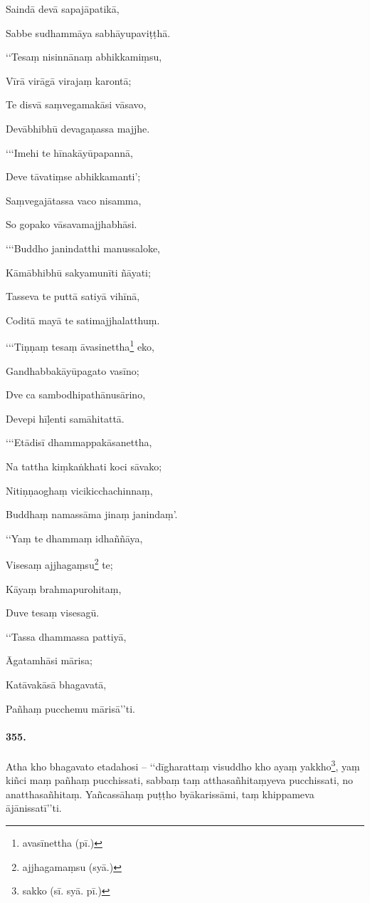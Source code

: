 Saindā devā sapajāpatikā,

Sabbe sudhammāya sabhāyupaviṭṭhā.

‘‘Tesaṃ nisinnānaṃ abhikkamiṃsu,

Vīrā virāgā virajaṃ karontā;

Te disvā saṃvegamakāsi vāsavo,

Devābhibhū devagaṇassa majjhe.

‘‘‘Imehi te hīnakāyūpapannā,

Deve tāvatiṃse abhikkamanti’;

Saṃvegajātassa vaco nisamma,

So gopako vāsavamajjhabhāsi.

‘‘‘Buddho janindatthi manussaloke,

Kāmābhibhū sakyamunīti ñāyati;

Tasseva te puttā satiyā vihīnā,

Coditā mayā te satimajjhalatthuṃ.

‘‘‘Tiṇṇaṃ tesaṃ āvasinettha\footnote{avasīnettha (pī.)} eko,

Gandhabbakāyūpagato vasīno;

Dve ca sambodhipathānusārino,

Devepi hīḷenti samāhitattā.

‘‘‘Etādisī dhammappakāsanettha,

Na tattha kiṃkaṅkhati koci sāvako;

Nitiṇṇaoghaṃ vicikicchachinnaṃ,

Buddhaṃ namassāma jinaṃ janindaṃ’.

‘‘Yaṃ te dhammaṃ idhaññāya,

Visesaṃ ajjhagaṃsu\footnote{ajjhagamaṃsu (syā.)} te;

Kāyaṃ brahmapurohitaṃ,

Duve tesaṃ visesagū.

‘‘Tassa dhammassa pattiyā,

Āgatamhāsi mārisa;

Katāvakāsā bhagavatā,

Pañhaṃ pucchemu mārisā’’ti.

\paragraph{355.} Atha kho bhagavato etadahosi – ‘‘dīgharattaṃ visuddho kho ayaṃ yakkho\footnote{sakko (sī. syā. pī.)}, yaṃ kiñci maṃ pañhaṃ pucchissati, sabbaṃ taṃ atthasañhitaṃyeva pucchissati, no anatthasañhitaṃ. Yañcassāhaṃ puṭṭho byākarissāmi, taṃ khippameva ājānissatī’’ti.


